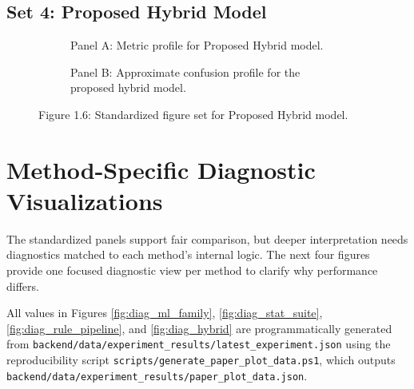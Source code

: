 \documentclass[12pt,a4paper]{report}
\begin{document}
\subsection{Set 4: Proposed Hybrid Model}
\begin{figure}[H]
\centering
\begin{subfigure}[t]{0.49\textwidth}
\centering
{}
\caption{Panel A: Metric profile for Proposed Hybrid model.}
\end{subfigure}
\hfill
\begin{subfigure}[t]{0.49\textwidth}
\centering
{}
\caption{Panel B: Approximate confusion profile for the proposed hybrid model.}
\end{subfigure}
\caption{Figure 1.6: Standardized figure set for Proposed Hybrid model.}
\label{fig:set_hybrid}
\end{figure}

\section{Method-Specific Diagnostic Visualizations}
The standardized panels support fair comparison, but deeper interpretation needs diagnostics matched to each method's internal logic. The next four figures provide one focused diagnostic view per method to clarify why performance differs.

All values in Figures \ref{fig:diag_ml_family}, \ref{fig:diag_stat_suite}, \ref{fig:diag_rule_pipeline}, and \ref{fig:diag_hybrid} are programmatically generated from
\texttt{backend/data/experiment\_results/latest\_experiment.json} using the reproducibility script
\texttt{scripts/generate\_paper\_plot\_data.ps1}, which outputs \texttt{backend/data/experiment\_results/paper\_plot\_data.json}.
\end{document}
